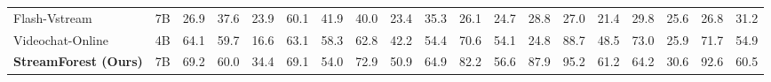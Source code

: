 \begin{table}[ht]
{\begin{tabular}{lc|cccccccccccccccc|c}
        Flash-Vstream~\cite{zhang2024flashvstream}                 & 7B                                                       & 26.9                  & 37.6                    & 23.9                  & 60.1                   & 41.9                     & 40.0                   & 23.4                  & 35.3                    & 26.1                  & 24.7                  & 28.8                  & 27.0                   & 21.4                   & 29.8                  & 25.6                    & 26.8                  & 31.2                                      \\
        Videochat-Online~\cite{huang2024videochatonline}                        & 4B                                                       & 64.1                  & 59.7                  & 16.6                  & 63.1                   & 58.3                     & 62.8                   & 42.2                  & 54.4                    & 70.6                  & 54.1                  & 24.8                  & 88.7                   & 48.5                   & 73.0                  & 25.9                    & 71.7                  & 54.9                                      \\ \midrule 
        \textbf{StreamForest (Ours)}                       & {7B}                                                       & {69.2}                  & {60.0}                  & {34.4}                  & {69.1}                   & {54.0}                     & {72.9}                   & {50.9}                  & {64.9}                    & {82.2}                  & {56.6}                  & {87.9}                  & {95.2}                   & {61.2}                   & {64.2}                  & {30.6}                    & {92.6}                  & {60.5}                                      \\
        
    
    \bottomrule \bottomrule
    
    \end{tabular}%
    }


\label{app:tab:ov_bench}
    \end{table}
